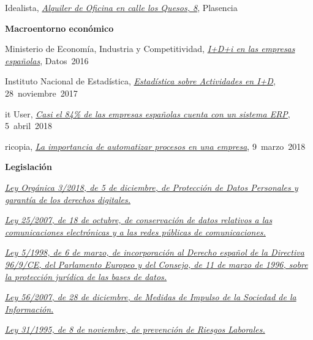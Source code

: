 	
		Idealista,
		\href{https://www.idealista.com/inmueble/2207606/}{\textit{Alquiler de Oficina en calle los Quesos, 8}},
		\mbox{Plasencia}


\textbf{Macroentorno económico}

		Ministerio de Economía, Industria y Competitividad,
		\href{http://www.ipyme.org/Publicaciones/Informe-IDi-2016.pdf}{\textit{I+D+i en las empresas españolas}},
		\mbox{Datos 2016}

		Instituto Nacional de Estadística,
		\href{https://www.ine.es/prensa/imasd_2016.pdf}{\textit{Estadística sobre Actividades en I+D}},
		\mbox{28 noviembre 2017}
		
		it User,
		\href{https://www.ituser.es/actualidad/2018/04/casi-el-84-de-las-empresas-espanolas-cuenta-con-un-sistema-erp}{\textit{Casi el 84\% de las empresas españolas cuenta con un sistema ERP}},
		\mbox{5 abril 2018}
		
		ricopia,
		\href{https://www.ricopia.com/la-importancia-automatizar-procesos-una-empresa/}{\textit{La importancia de automatizar procesos en una empresa}},
		\mbox{9 marzo 2018}
		
\textbf{Legislación}
		
		\href{https://www.boe.es/buscar/act.php?id=BOE-A-2018-16673}{\textit{Ley Orgánica 3/2018, de 5 de diciembre, de Protección de Datos Personales y garantía de los derechos digitales.}}
		
		\href{https://www.boe.es/buscar/act.php?id=BOE-A-2007-18243}{\textit{Ley 25/2007, de 18 de octubre, de conservación de datos relativos a las comunicaciones electrónicas y a las redes públicas de comunicaciones.}}
		
		\href{https://www.boe.es/buscar/doc.php?id=BOE-A-1998-5568}{\textit{Ley 5/1998, de 6 de marzo, de incorporación al Derecho español de la Directiva 96/9/CE, del Parlamento Europeo y del Consejo, de 11 de marzo de 1996, sobre la protección jurídica de las bases de datos.}}
		
		\href{https://www.boe.es/buscar/doc.php?id=BOE-A-2007-22440}{\textit{Ley 56/2007, de 28 de diciembre, de Medidas de Impulso de la Sociedad de la Información.}}
		
		\href{https://www.boe.es/buscar/act.php?id=BOE-A-1995-24292}{\textit{Ley 31/1995, de 8 de noviembre, de prevención de Riesgos Laborales.}}
		
